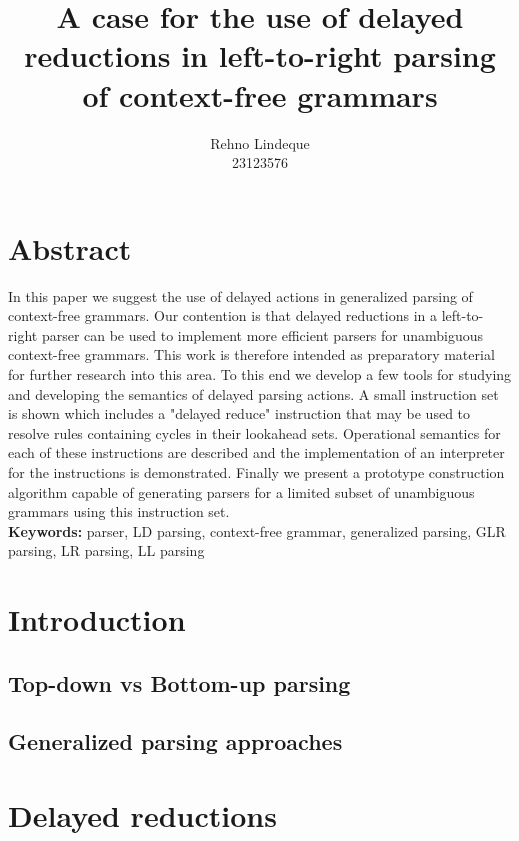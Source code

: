 \documentclass[11pt]{article}
\begin{document}
\title{A case for the use of delayed reductions in left-to-right parsing of context-free grammars}
\author{Rehno Lindeque
\\23123576}

\maketitle

\section*{Abstract}
In this paper we suggest the use of delayed actions in generalized parsing of context-free grammars. 
Our contention is that delayed reductions in a left-to-right parser can be used to implement more efficient parsers for unambiguous context-free grammars. 
This work is therefore intended as preparatory material for further research into this area. 
To this end we develop a few tools for studying and developing the semantics of delayed parsing actions.
A small instruction set is shown which includes a "delayed reduce" instruction that may be used to resolve rules containing cycles in their lookahead sets.
Operational semantics for each of these instructions are described and the implementation of an interpreter for the instructions is demonstrated.
Finally we present a prototype construction algorithm capable of generating parsers for a limited subset of unambiguous grammars using this instruction set.\\

\textbf{Keywords:} parser, LD parsing, context-free grammar, generalized parsing, GLR parsing, LR parsing, LL parsing

\section{Introduction}

\subsection{Top-down vs Bottom-up parsing}

\subsection{Generalized parsing approaches}

\section{Delayed reductions}
\end{document}
